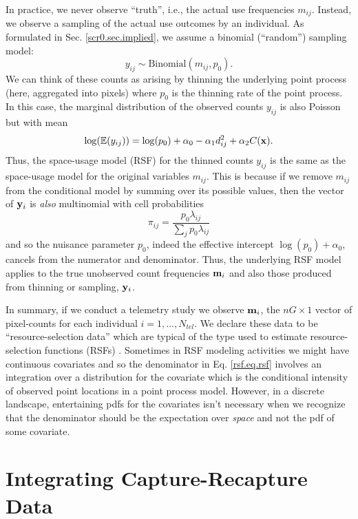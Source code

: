 In practice, we never observe ``truth'', i.e., the actual use
frequencies $m_{ij}$. Instead, we observe a sampling of the actual use
outcomes by an individual.  As formulated in Sec. \ref{scr0.sec.implied},
we assume a binomial (``random'') sampling model:
\[
 y_{ij} \sim \mbox{Binomial}(m_{ij}, p_{0}).
\]
We can think of these counts as arising by thinning the underlying
point process (here, aggregated into pixels) where $p_{0}$ is the
thinning rate of the point process.  In this case, the marginal
distribution of the observed counts $y_{ij}$ is also Poisson but with mean
\[
 \log(\mathbb{E}(y_{ij}))  = \log(p_{0}) + \alpha_{0} -\alpha_{1} d_{ij}^{2} +  \alpha_{2} C({\bf x}).
\]
Thus, the space-usage model (RSF) for the thinned counts $y_{ij}$ is
the same as the space-usage model for the original variables $m_{ij}$.
This is because if we remove $m_{ij}$ from the conditional model by
summing over its possible values, then the vector of ${\bf y}_{i}$ is
{\it also} multinomial with cell probabilities
\[
\pi_{ij} = \frac{p_{0}\lambda_{ij}}{\sum_{j} p_{0} \lambda_{ij}}
\]
and so the nuisance parameter $p_{0}$, indeed the effective intercept
$\log(p_{0}) + \alpha_{0}$, 
 cancels from the numerator and
denominator. Thus, the underlying RSF model applies to the true
unobserved count frequencies ${\bf m}_{i}$ and also those produced
from thinning or sampling, ${\bf y}_{i}$.


In summary, if we conduct a telemetry study we observe ${\bf m}_{i}$,
the $nG \times 1$ vector of pixel-counts for each individual
$i=1,\ldots,N_{tel}$.  We declare these data to be
``resource-selection data'' which are typical of the type used to
estimate resource-selection functions (RSFs) \citep{manly_etal:2002}.
Sometimes in RSF modeling activities we might have continuous
covariates and so the denominator in Eq. \ref{rsf.eq.rsf} involves an
integration over a distribution for the covariate which is the
conditional intensity of observed point locations in a point process
model. However, in a discrete landscape, entertaining pdfs for the
covariates isn't necessary \citep{royle_etal:2012mee} when we
recognize that the denominator should be the expectation over {\it
  space} and not the pdf of some covariate.


\section{Integrating Capture-Recapture Data}

